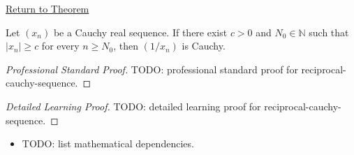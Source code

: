 \newpage
{}
\label{prf:reciprocal-cauchy-sequence}

\begin{remark*}[Return]
\hyperref[thm:reciprocal-cauchy-sequence]{Return to Theorem}
\end{remark*}

\begin{theorem*}
Let $(x_n)$ be a Cauchy real sequence. If there exist $c>0$ and
$N_0\in\mathbb{N}$ such that $|x_n|\ge c$ for every $n\ge N_0$, then
$(1/x_n)$ is Cauchy.

\smallskip
\noindent
\end{theorem*}

\begin{proof}[Professional Standard Proof]
\LRAProofBodyStart
TODO: professional standard proof for reciprocal-cauchy-sequence.
\end{proof}

\begin{proof}[Detailed Learning Proof]
\LRAProofBodyStart
TODO: detailed learning proof for reciprocal-cauchy-sequence.
\end{proof}

\begin{remark*}
\end{remark*}

\begin{dependencies}
\begin{itemize}
  \item TODO: list mathematical dependencies.
\end{itemize}
\end{dependencies}

\clearpage
